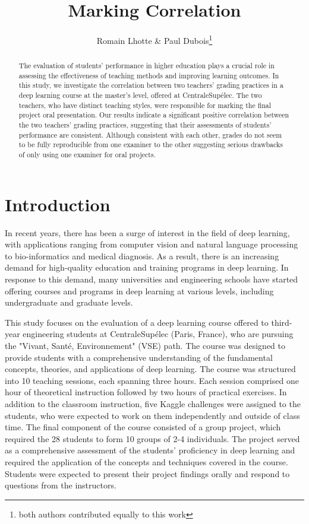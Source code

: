 \documentclass[a4paper]{article}
\title{Marking Correlation}
\author{Romain Lhotte \& Paul Dubois\footnote{both authors contributed equally to this work}}
\begin{document}
	\maketitle
	\begin{abstract}
		The evaluation of students' performance in higher education plays a crucial role in assessing the effectiveness of teaching methods and improving learning outcomes.
		In this study, we investigate the correlation between two teachers' grading practices in a deep learning course at the master's level, offered at CentraleSupélec.
		The two teachers, who have distinct teaching styles, were responsible for marking the final project oral presentation.
		Our results indicate a significant positive correlation between the two teachers' grading practices, suggesting that their assessments of students' performance are consistent.
		Although consistent with each other, grades do not seem to be fully reproducible from one examiner to the other suggesting serious drawbacks of only using one examiner for oral projects.
	\end{abstract}
	
	\section{Introduction}
	In recent years, there has been a surge of interest in the field of deep learning, with applications ranging from computer vision and natural language processing to bio-informatics and medical diagnosis.
	As a result, there is an increasing demand for high-quality education and training programs in deep learning.
	In response to this demand, many universities and engineering schools have started offering courses and programs in deep learning at various levels, including undergraduate and graduate levels.
	
	This study focuses on the evaluation of a deep learning course offered to third-year engineering students at CentraleSupélec (Paris, France), who are pursuing the "Vivant, Santé, Environnement" (VSE) path.
	The course was designed to provide students with a comprehensive understanding of the fundamental concepts, theories, and applications of deep learning.
	The course was structured into 10 teaching sessions, each spanning three hours.
	Each session comprised one hour of theoretical instruction followed by two hours of practical exercises.
	In addition to the classroom instruction, five Kaggle challenges were assigned to the students, who were expected to work on them independently and outside of class time.
	The final component of the course consisted of a group project, which required the 28 students to form 10 groups of 2-4 individuals.
	The project served as a comprehensive assessment of the students' proficiency in deep learning and required the application of the concepts and techniques covered in the course.
	Students were expected to present their project findings orally and respond to questions from the instructors.
	
\end{document}
